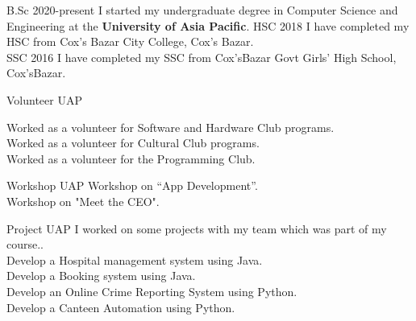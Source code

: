 \documentclass[11pt]{spidercv}
\begin{document}
    \begin{MainPart}
    
    \Experience
        {\ColorHighlight}
		{B.Sc}
		{}
        {2020-present}
        {   
          I started my undergraduate degree in Computer Science and Engineering at the \textbf{University of Asia Pacific}.          
        }
    \Experience
        {\ColorHighlight}
		{HSC}
		{}
        {2018}
        {   
            I have completed my HSC from Cox's Bazar City College, Cox's Bazar.\\
            
        }
    \Experience
        {\ColorHighlight}
		{SSC}
		{}
        {2016}
        {   
            I have completed my SSC from Cox'sBazar Govt Girls' High School, Cox'sBazar.\\
        }

    \vspace*{0.1cm}

    \Experience
        {\ColorHighlight}
		{Volunteer}
		{UAP}
        {}
        {   
            Worked as a volunteer for Software and Hardware Club programs.\\
            Worked as a volunteer for Cultural Club programs.\\
            Worked as a volunteer for the Programming Club.
    
        }
    \Experience
        {\ColorHighlight}
		{Workshop}
		{UAP}
        {}
        {   
            Workshop on “App Development”.\\
            Workshop on "Meet the CEO".\\
            
        }

        \Experience
        {\ColorHighlight}
		{Project}
		{UAP}
        {}
        {   
            I worked on some projects with my team which was part of my course..\\
            Develop a Hospital management system using Java.\\
            Develop a Booking system using Java.\\
            Develop an Online Crime Reporting System using Python.\\
            Develop a Canteen Automation using Python.\\
        }
   

\end{MainPart}
\end{document}
